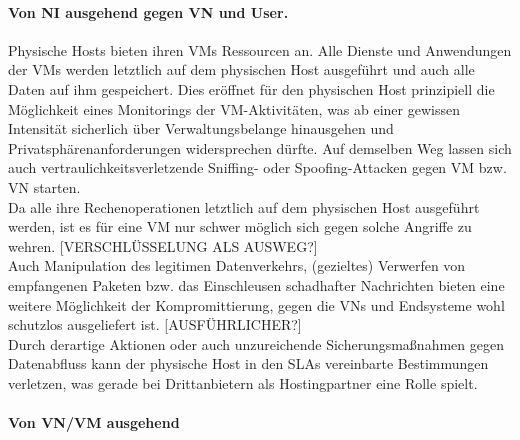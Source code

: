 \paragraph{Von NI ausgehend gegen VN und User.}
\label{parag:vonNI}
Physische Hosts bieten ihren VMs Ressourcen an. Alle Dienste und Anwendungen der VMs werden letztlich auf dem physischen Host ausgeführt und auch alle Daten auf ihm gespeichert. Dies eröffnet für den physischen Host prinzipiell die Möglichkeit eines Monitorings der VM-Aktivitäten, was ab einer gewissen Intensität sicherlich über Verwaltungsbelange hinausgehen und Privatsphärenanforderungen widersprechen dürfte. Auf demselben Weg lassen sich auch vertraulichkeitsverletzende Sniffing- oder Spoofing-Attacken gegen VM bzw. VN starten. \\
Da alle ihre Rechenoperationen letztlich auf dem physischen Host ausgeführt werden, ist es für eine VM nur schwer möglich sich gegen solche Angriffe zu wehren. [VERSCHLÜSSELUNG ALS AUSWEG?]\\
Auch Manipulation des legitimen Datenverkehrs, (gezieltes) Verwerfen von empfangenen Paketen bzw. das Einschleusen schadhafter Nachrichten bieten eine weitere Möglichkeit der Kompromittierung, gegen die VNs und Endsysteme wohl schutzlos ausgeliefert ist.
[AUSFÜHRLICHER?]\\
Durch derartige Aktionen oder auch unzureichende Sicherungsmaßnahmen gegen Datenabfluss kann der physische Host in den SLAs vereinbarte Bestimmungen verletzen, was gerade bei Drittanbietern als Hostingpartner eine Rolle spielt.



\paragraph{Von VN/VM ausgehend}
\label{parag:vonVN}


